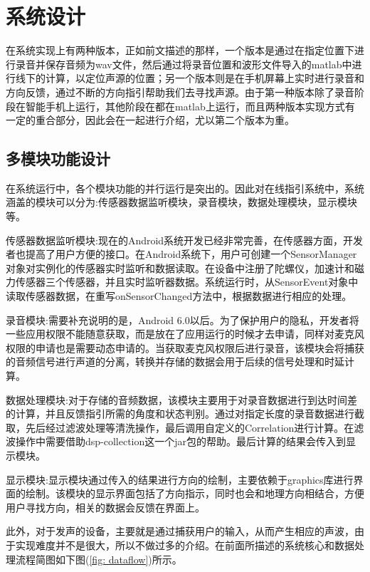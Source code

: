 \documentclass[winfonts,oneside]{njuthesis}
\begin{document}
	\section{系统设计}
	
		在系统实现上有两种版本，正如前文描述的那样，一个版本是通过在指定位置下进行录音并保存音频为wav文件，然后通过将录音位置和波形文件导入的matlab中进行线下的计算，以定位声源的位置；另一个版本则是在手机屏幕上实时进行录音和方向反馈，通过不断的方向指引帮助我们去寻找声源。由于第一种版本除了录音阶段在智能手机上运行，其他阶段在都在matlab上运行，而且两种版本实现方式有一定的重合部分，因此会在一起进行介绍，尤以第二个版本为重。
		
		\subsection{多模块功能设计}
		
			在系统运行中，各个模块功能的并行运行是突出的。因此对在线指引系统中，系统涵盖的模块可以分为:传感器数据监听模块，录音模块，数据处理模块，显示模块等。
			
			传感器数据监听模块:现在的Android系统开发已经非常完善，在传感器方面，开发者也提高了用户方便的接口。在Android系统下，用户可创建一个SensorManager对象对实例化的传感器实时监听和数据读取。在设备中注册了陀螺仪，加速计和磁力传感器三个传感器，并且实时监听器数据。系统运行时，从SensorEvent对象中读取传感器数据，在重写onSensorChanged方法中，根据数据进行相应的处理。
			
			录音模块:需要补充说明的是，Android 6.0以后。为了保护用户的隐私，开发者将一些应用权限不能随意获取，而是放在了应用运行的时候才去申请，同样对麦克风权限的申请也是需要动态申请的。当获取麦克风权限后进行录音，该模块会将捕获的音频信号进行声道的分离，转换并存储的数据会用于后续的信号处理和时延计算。
			
			数据处理模块:对于存储的音频数据，该模块主要用于对录音数据进行到达时间差的计算，并且反馈指引所需的角度和状态判别。通过对指定长度的录音数据进行截取，先后经过滤波处理等清洗操作，最后调用自定义的Correlation进行计算。在滤波操作中需要借助dsp-collection这一个jar包的帮助。最后计算的结果会传入到显示模块。
			
			显示模块:显示模块通过传入的结果进行方向的绘制，主要依赖于graphics库进行界面的绘制。该模块的显示界面包括了方向指示，同时也会和地理方向相结合，方便用户寻找方向，相关的数据会反馈在界面上。
			
			此外，对于发声的设备，主要就是通过捕获用户的输入，从而产生相应的声波，由于实现难度并不是很大，所以不做过多的介绍。在前面所描述的系统核心和数据处理流程简图如下图(\ref{fig: dataflow})所示。
			
\end{document}
